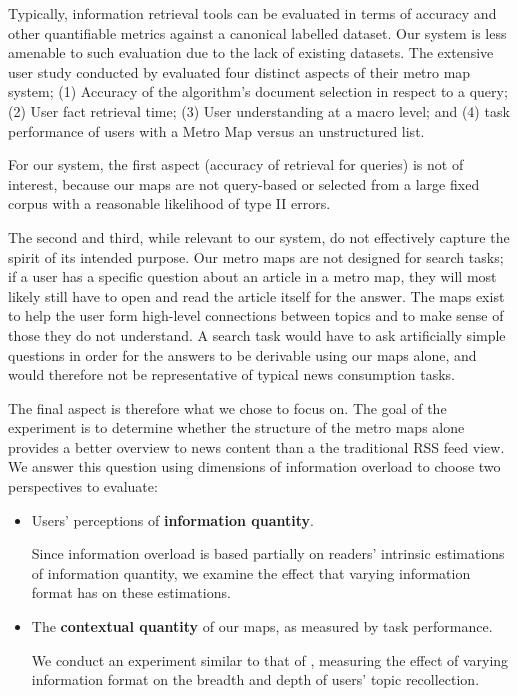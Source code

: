 Typically, information retrieval tools can be evaluated in terms of  accuracy and other quantifiable metrics against a canonical labelled dataset. Our system is less amenable to such evaluation due to the lack of existing datasets. The extensive user study conducted by \cite{GeneratingInformationMaps} evaluated four distinct aspects of their metro map system; (1) Accuracy of the algorithm's document selection in respect to a query; (2) User fact retrieval time; (3) User understanding at a macro level; and (4) task performance of users with a Metro Map versus an unstructured list.

For our system, the first aspect (accuracy of retrieval for queries) is not of interest, because our maps are not query-based or selected from a large fixed corpus with a reasonable likelihood of type II errors.

The second and third, while relevant to our system, do not effectively capture the spirit of its intended purpose. Our metro maps are not designed for search tasks; if a user has a specific question about an article in a metro map, they will most likely still have to open and read the article itself for the answer. The maps exist to help the user form high-level connections between topics and to make sense of those they do not understand. A search task would have to ask artificially simple questions in order for the answers to be derivable using our maps alone, and would therefore not be representative of typical news consumption tasks.

The final aspect is therefore what we chose to focus on. The goal of the experiment is to determine whether the structure of the metro maps alone provides a better overview to news content than a the traditional RSS feed view. We answer this question using  dimensions of information overload to choose two perspectives to evaluate:

\begin{itemize}
	\item Users' perceptions of \textbf{information quantity}. \par
		Since information overload is based partially on readers' intrinsic estimations of information quantity, we examine the effect that varying information format has on these estimations.
	\item The \textbf{contextual quantity} of our maps, as measured by task performance. \par
		We conduct an experiment similar to that of \cite{scattergather}, measuring the effect of varying information format on the breadth and depth of users' topic recollection.
\end{itemize}


